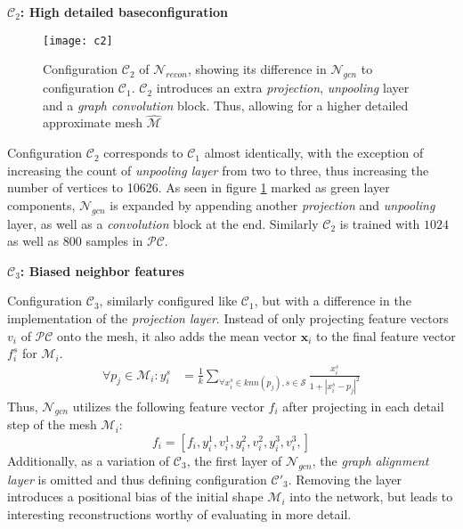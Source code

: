 \textbf{$\mathcal{C}_2$: High detailed baseconfiguration}
\begin{figure}
   \begin{center}
   \texttt{[image: c2]}
   \caption{Configuration $\mathcal{C}_2$ of $\mathcal{N}_{recon}$, showing its difference in $\mathcal{N}_{gcn}$ to configuration $\mathcal{C}_1$.
   $\mathcal{C}_2$ introduces an extra \emph{projection}, \emph{unpooling} layer and a \emph{graph convolution} block. Thus, allowing for a higher detailed approximate mesh $\hat{\mathcal{M}}$ }
   \label{fig:c2}
   \end{center}
\end{figure}
Configuration $\mathcal{C}_2$ corresponds to $\mathcal{C}_1$ almost identically, 
with the exception of increasing the count of \emph{unpooling layer} from two to three, thus increasing
 the number of vertices to 10626. As seen in figure \ref{fig:c2} marked as green layer components, $\mathcal{N}_{gcn}$
  is expanded by appending another \emph{projection} and  \emph{unpooling} layer, as well
   as a \emph{convolution} block at the end. Similarly $\mathcal{C}_2$ is trained with $1024$ as well as $800$ samples
   in $\mathcal{PC}$.

\textbf{$\mathcal{C}_3$: Biased neighbor features}

Configuration $\mathcal{C}_3$, similarly configured like $\mathcal{C}_1$, but with a difference in the implementation of the \emph{projection layer}.
Instead of only projecting feature vectors $v_i$ of $\mathcal{PC}$ onto the mesh, it also adds the mean vector $\textbf{x}_i$ 
to the final feature vector $f_i^s$ for $\mathcal{M}_i$.
 \begin{align}
      \forall p_j \in \mathcal{M}_{i} : y_i^s &= \frac{1}{k}\sum_{\forall x_i^s \in knn(p_j),s\in \mathcal{S}} \frac{x_i^s}{1 + |x_i^s-p_j|^2}
   \end{align}
Thus, $\mathcal{N}_{gcn}$ utilizes the following feature vector $f_i$ after projecting in each detail step of the mesh $\mathcal{M}_i$:
\[f_i = [f_i, y_i^1, v_i^1, y_i^2, v_i^2,y_i^3, v_i^3,] \]
Additionally, as a variation of $\mathcal{C}_3$, the first layer of $\mathcal{N}_{gcn}$, the \emph{graph alignment layer} is omitted and 
thus defining configuration $\mathcal{C}'_3$. Removing the layer introduces a positional bias of the initial shape $\mathcal{M}_i$ into the network, but
leads to interesting reconstructions worthy of evaluating in more detail.

